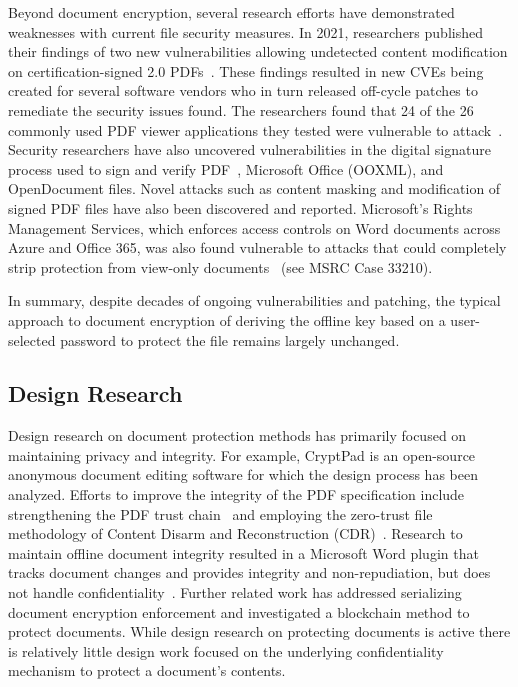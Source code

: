 Beyond document encryption, several research efforts have demonstrated weaknesses with current file security measures. In 2021, researchers published their findings of two new vulnerabilities allowing undetected content modification on certification-signed 2.0 PDFs~\cite{rohlmann_breaking_2021}. These findings resulted in new CVEs being created for several software vendors who in turn released off-cycle patches to remediate the security issues found. The researchers found that 24 of the 26 commonly used PDF viewer applications they tested were vulnerable to attack~\cite{rohlmann_breaking_2021}. Security researchers have also uncovered vulnerabilities in the digital signature process used to sign and verify PDF~\cite{rohlmann_breaking_2021}, Microsoft Office (OOXML), and OpenDocument files. Novel attacks such as content masking and modification of signed PDF files have also been discovered and reported. Microsoft's Rights Management Services, which enforces access controls on Word documents across Azure and Office 365, was also found vulnerable to attacks that could completely strip protection from view-only documents~\cite{grothe_rms_2016} (see MSRC Case 33210).

In summary, despite decades of ongoing vulnerabilities and patching, the typical approach to document encryption of deriving the offline key based on a user-selected password to protect the file remains largely unchanged.

\subsection{Design Research}
\label{sec:doc-design-research}

Design research on document protection methods has primarily focused on maintaining privacy and integrity. For example, CryptPad is an open-source anonymous document editing software for which the design process has been analyzed. Efforts to improve the integrity of the PDF specification include strengthening the PDF trust chain~\cite{tullsen_weak_2022} and employing the zero-trust file methodology of Content Disarm and Reconstruction (CDR)~\cite{dubin_cdr_2023}. Research to maintain offline document integrity resulted in a Microsoft Word plugin that tracks document changes and provides integrity and non-repudiation, but does not handle confidentiality~\cite{shatnawi_maintaining_2017}. Further related work has addressed serializing document encryption enforcement and investigated a blockchain method to protect documents. While design research on protecting documents is active there is relatively little design work focused on the underlying confidentiality mechanism to protect a document's contents.

